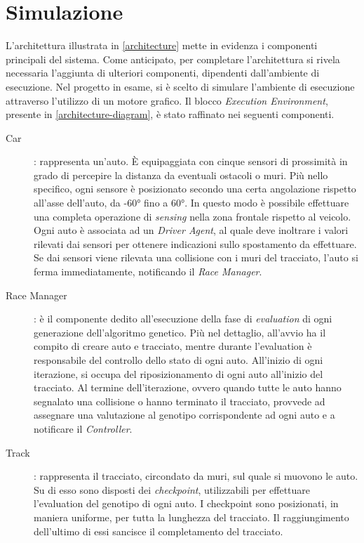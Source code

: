 \documentclass[a4paper,12pt]{article}
\begin{document}
\section{Simulazione} \label{simulation}
L'architettura illustrata in \autoref{architecture} mette in evidenza i componenti principali del sistema. Come anticipato, per completare l'architettura si rivela necessaria l'aggiunta di ulteriori componenti, dipendenti dall'ambiente di esecuzione. Nel progetto in esame, si è scelto di simulare l'ambiente di esecuzione attraverso l'utilizzo di un motore grafico. Il blocco \emph{Execution Environment}, presente in \autoref{architecture-diagram}, è stato raffinato nei seguenti componenti.
\begin{description}
	\item[Car]: rappresenta un'auto. È equipaggiata con cinque sensori di prossimità in grado di percepire la distanza da eventuali ostacoli o muri. Più nello specifico, ogni sensore è posizionato secondo una certa angolazione rispetto all'asse dell'auto, da \ang{-60} fino a \ang{+60}. In questo modo è possibile effettuare una completa operazione di \emph{sensing} nella zona frontale rispetto al veicolo. Ogni auto è associata ad un \emph{Driver Agent}, al quale deve inoltrare i valori rilevati dai sensori per ottenere indicazioni sullo spostamento da effettuare. Se dai sensori viene rilevata una collisione con i muri del tracciato, l'auto si ferma immediatamente, notificando il \emph{Race Manager}.
	\item[Race Manager]: è il componente dedito all'esecuzione della fase di \emph{evaluation} di ogni generazione dell'algoritmo genetico. Più nel dettaglio, all'avvio ha il compito di creare auto e tracciato, mentre durante l'evaluation è responsabile del controllo dello stato di ogni auto. All'inizio di ogni iterazione, si occupa del riposizionamento di ogni auto all'inizio del tracciato. Al termine dell'iterazione, ovvero quando tutte le auto hanno segnalato una collisione o hanno terminato il tracciato, provvede ad assegnare una valutazione al genotipo corrispondente ad ogni auto e a notificare il \emph{Controller}.
	\item[Track]: rappresenta il tracciato, circondato da muri, sul quale si muovono le auto. Su di esso sono disposti dei \emph{checkpoint}, utilizzabili per effettuare l'evaluation del genotipo di ogni auto. I checkpoint sono posizionati, in maniera uniforme, per tutta la lunghezza del tracciato. Il raggiungimento dell'ultimo di essi sancisce il completamento del tracciato.
\end{description}
\end{document}
